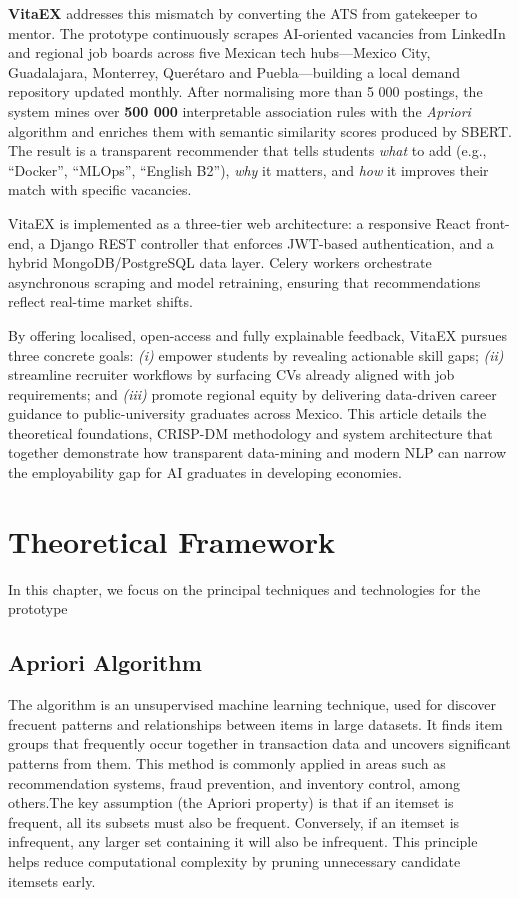 \documentclass[runningheads]{llncs}
\begin{document}
\textbf{VitaEX} addresses this mismatch by converting the ATS from gatekeeper to mentor.  
The prototype continuously scrapes AI-oriented vacancies from LinkedIn and regional job boards across five Mexican tech hubs—Mexico City, Guadalajara, Monterrey, Querétaro and Puebla—building a local demand repository updated monthly.  
After normalising more than 5 000 postings, the system mines over \textbf{500 000} interpretable association rules with the \emph{Apriori} algorithm and enriches them with semantic similarity scores produced by SBERT.  
The result is a transparent recommender that tells students \emph{what} to add (e.g., “Docker”, “MLOps”, “English B2”), \emph{why} it matters, and \emph{how} it improves their match with specific vacancies.

VitaEX is implemented as a three-tier web architecture: a responsive React front-end, a Django REST controller that enforces JWT-based authentication, and a hybrid MongoDB/PostgreSQL data layer.  
Celery workers orchestrate asynchronous scraping and model retraining, ensuring that recommendations reflect real-time market shifts.

By offering localised, open-access and fully explainable feedback, VitaEX pursues three concrete goals:  
\emph{(i)} empower students by revealing actionable skill gaps;  
\emph{(ii)} streamline recruiter workflows by surfacing CVs already aligned with job requirements; and  
\emph{(iii)} promote regional equity by delivering data-driven career guidance to public-university graduates across Mexico.  
This article details the theoretical foundations, CRISP-DM methodology and system architecture that together demonstrate how transparent data-mining and modern NLP can narrow the employability gap for AI graduates in developing economies.

	
	
	\section{Theoretical Framework}
	In this chapter, we focus on the principal techniques and technologies for the prototype
	\subsection{Apriori Algorithm}
	
	The algorithm is an unsupervised machine learning technique, used for discover frecuent patterns and relationships between items in large datasets. It finds item groups that frequently occur together in transaction data and uncovers significant patterns from them. This method is commonly applied in areas such as recommendation systems, fraud prevention, and inventory control, among others.The key assumption (the Apriori property) is that if an itemset is frequent, all its subsets must also be frequent. Conversely, if an itemset is infrequent, any larger set containing it will also be infrequent. This principle helps reduce computational complexity by pruning unnecessary candidate itemsets early. \cite{ibm_apriori}
\end{document}
